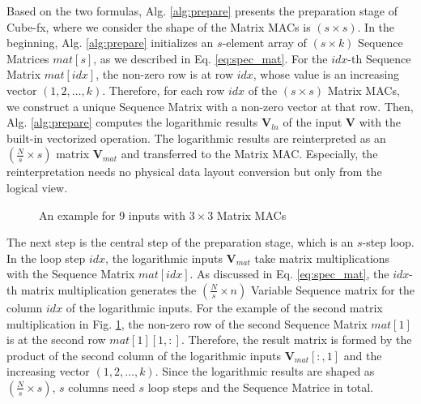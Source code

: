 Based on the two formulas, Alg. \ref{alg:prepare} presents the preparation stage of Cube-fx, where we consider the shape of the Matrix MACs is $(s \times s)$. In the beginning, Alg. \ref{alg:prepare} initializes an $s$-element array of $(s \times k)$ Sequence Matrices $mat[s]$, as we described in Eq. \ref{eq:spec_mat}. For the $idx$-th Sequence Matrix $mat[idx]$, the non-zero row is at row $idx$, whose value is an increasing vector $(1, 2, \dots, k)$. Therefore, for each row $idx$ of the $(s \times s)$ Matrix MACs, we construct a unique Sequence Matrix with a non-zero vector at that row. Then, Alg. \ref{alg:prepare} computes the logarithmic results $\textbf{V}_{ln}$ of the input $\textbf{V}$ with the built-in vectorized operation. The logarithmic results are reinterpreted as an $(\frac{N}{s} \times s)$ matrix $\textbf{V}_{mat}$ and transferred to the Matrix MAC. Especially, the reinterpretation needs no physical data layout conversion but only from the logical view. 

\begin{figure}[t]
    \caption{An example for 9 inputs with $3 \times 3$ Matrix MACs}
    \label{fig:trans_ln}
    \end{figure}

The next step is the central step of the preparation stage, which is an $s$-step loop. In the loop step $idx$, the logarithmic inputs $\textbf{V}_{mat}$ take matrix multiplications with the Sequence Matrix $mat[idx]$. As discussed in Eq. \ref{eq:spec_mat}, the $idx$-th matrix multiplication generates the $(\frac{N}{s} \times n)$ Variable Sequence matrix for the column $idx$ of the logarithmic inputs. For the example of the second matrix multiplication in Fig. \ref{fig:trans_ln}, the non-zero row of the second Sequence Matrix $mat[1]$ is at the second row $mat[1][1, :]$. Therefore, the result matrix is formed by the product of the second column of the logarithmic inputs $\textbf{V}_{mat}[:, 1]$ and the increasing vector $(1, 2, \dots, k)$. Since the logarithmic results are shaped as $(\frac{N}{s} \times s)$, $s$ columns need $s$ loop steps and the Sequence Matrice in total.


